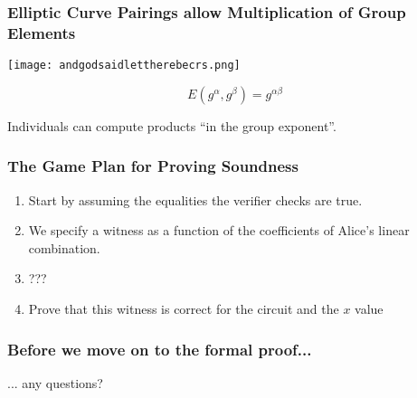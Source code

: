 \documentclass{beamer}
\begin{document}
\begin{frame}
    
    \frametitle{Elliptic Curve Pairings allow Multiplication of Group Elements}

    \begin{center}
        \texttt{[image: andgodsaidlettherebecrs.png]}        
    \end{center}

    $$ E(g^{\alpha}, g^{\beta}) = g^{\alpha\beta} $$

    Individuals can compute products ``in the group exponent''.
    
\end{frame}

\begin{frame}
    
    \frametitle{The Game Plan for Proving Soundness}

    \begin{enumerate}
        \item Start by assuming the equalities the verifier checks are true.
        \item We specify a witness as a function of the coefficients of Alice's linear combination.
        \item ???
        \item Prove that this witness is correct for the circuit and the $x$ value
    \end{enumerate}
    
\end{frame}

\begin{frame}
    
    \frametitle{Before we move on to the formal proof...}

    \begin{center}
        ... any questions?        
    \end{center}

    
    
\end{frame}


\end{document}
